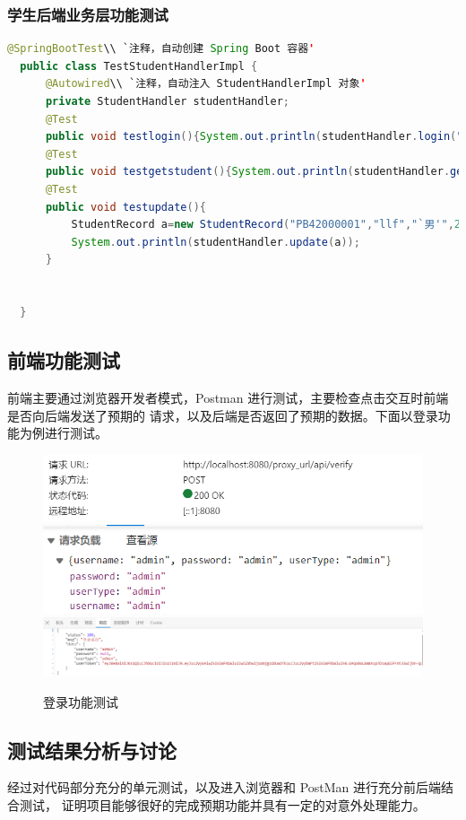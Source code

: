 \documentclass[12pt, a4paper]{article}
\begin{document}
\subsubsection{学生后端业务层功能测试}
\begin{lstlisting}[language=Java]
  @SpringBootTest\\ `注释，自动创建 Spring Boot 容器'
  public class TestStudentHandlerImpl {
      @Autowired\\ `注释，自动注入 StudentHandlerImpl 对象'
      private StudentHandler studentHandler;
      @Test
      public void testlogin(){System.out.println(studentHandler.login("PB42000001","123456"));}
      @Test
      public void testgetstudent(){System.out.println(studentHandler.getStudent("PB42000001"));}
      @Test
      public void testupdate(){
          StudentRecord a=new StudentRecord("PB42000001","llf","`男'",21,"cs","123456");
          System.out.println(studentHandler.update(a));
      }
  
  
  }

\end{lstlisting}

\subsection{前端功能测试}
前端主要通过浏览器开发者模式，Postman 进行测试，主要检查点击交互时前端是否向后端发送了预期的
请求，以及后端是否返回了预期的数据。下面以登录功能为例进行测试。
\begin{figure}[H]
  \centering
  \includegraphics[width = 0.6 \textwidth]{loginRe.png}
  \includegraphics[width = 0.6 \textwidth]{loginPayload}
  \includegraphics[width = 0.9 \textwidth]{response}
  \caption{登录功能测试}
\end{figure}

\subsection{测试结果分析与讨论}
经过对代码部分充分的单元测试，以及进入浏览器和 PostMan 进行充分前后端结合测试，
证明项目能够很好的完成预期功能并具有一定的对意外处理能力。
\end{document}

